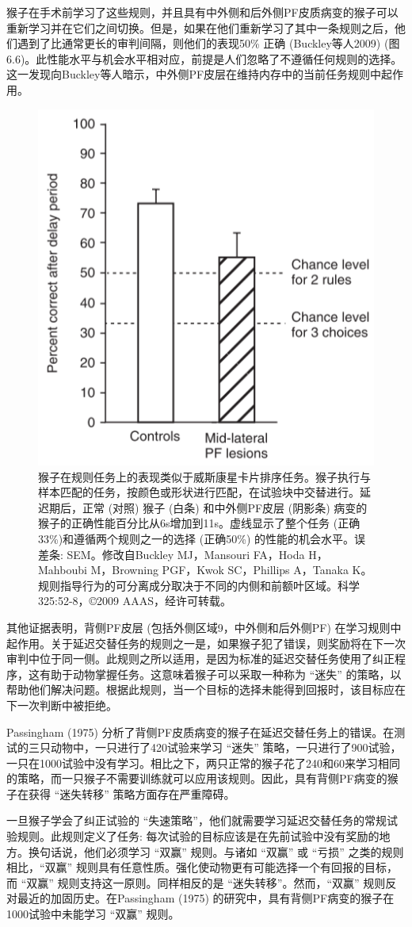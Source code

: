 猴子在手术前学习了这些规则，并且具有中外侧和后外侧PF皮质病变的猴子可以重新学习并在它们之间切换。但是，如果在他们重新学习了其中一条规则之后，他们遇到了比通常更长的审判间隔，则他们的表现50\% 正确 (Buckley等人2009) (图6.6)。此性能水平与机会水平相对应，前提是人们忽略了不遵循任何规则的选择。这一发现向Buckley等人暗示，中外侧PF皮层在维持内存中的当前任务规则中起作用。
\begin{figure}
	\centering
	\includegraphics[width=0.5\linewidth]{image_pfc/Fig_6_6}
	\caption{猴子在规则任务上的表现类似于威斯康星卡片排序任务。猴子执行与样本匹配的任务，按颜色或形状进行匹配，在试验块中交替进行。延迟期后，正常 (对照) 猴子 (白条) 和中外侧PF皮层 (阴影条) 病变的猴子的正确性能百分比从6s增加到11s。虚线显示了整个任务 (正确33\%)和遵循两个规则之一的选择 (正确50\%) 的性能的机会水平。误差条: SEM。修改自Buckley MJ，Mansouri FA，Hoda H，Mahboubi M，Browning PGF，Kwok SC，Phillips A，Tanaka K。规则指导行为的可分离成分取决于不同的内侧和前额叶区域。科学325:52-8，©2009 AAAS，经许可转载。 }
	\label{fig:fig}
\end{figure}
其他证据表明，背侧PF皮层 (包括外侧区域9，中外侧和后外侧PF) 在学习规则中起作用。关于延迟交替任务的规则之一是，如果猴子犯了错误，则奖励将在下一次审判中位于同一侧。此规则之所以适用，是因为标准的延迟交替任务使用了纠正程序，这有助于动物掌握任务。这意味着猴子可以采取一种称为 “迷失” 的策略，以帮助他们解决问题。根据此规则，当一个目标的选择未能得到回报时，该目标应在下一次判断中被拒绝。

Passingham (1975) 分析了背侧PF皮质病变的猴子在延迟交替任务上的错误。在测试的三只动物中，一只进行了420试验来学习 “迷失” 策略，一只进行了900试验，一只在1000试验中没有学习。相比之下，两只正常的猴子花了240和60来学习相同的策略，而一只猴子不需要训练就可以应用该规则。因此，具有背侧PF病变的猴子在获得 “迷失转移” 策略方面存在严重障碍。

一旦猴子学会了纠正试验的 “失速策略”，他们就需要学习延迟交替任务的常规试验规则。此规则定义了任务: 每次试验的目标应该是在先前试验中没有奖励的地方。换句话说，他们必须学习 “双赢” 规则。与诸如 “双赢” 或 “亏损” 之类的规则相比，“双赢” 规则具有任意性质。强化使动物更有可能选择一个有回报的目标，而 “双赢” 规则支持这一原则。同样相反的是 “迷失转移”。然而，“双赢” 规则反对最近的加固历史。在Passingham (1975) 的研究中，具有背侧PF病变的猴子在1000试验中未能学习 “双赢” 规则。
